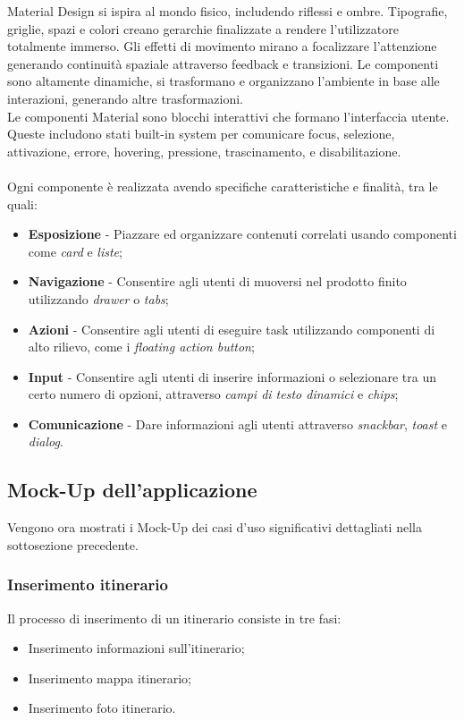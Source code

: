 \documentclass{natourDoc}
\begin{document}
Material Design si ispira al mondo fisico, includendo riflessi e ombre. Tipografie, griglie, spazi e colori creano gerarchie finalizzate a rendere l'utilizzatore totalmente immerso.
Gli effetti di movimento mirano a focalizzare l'attenzione generando continuità spaziale attraverso feedback e transizioni.
Le componenti sono altamente dinamiche, si trasformano e organizzano l'ambiente in base alle interazioni, generando altre trasformazioni.\\
Le componenti Material sono blocchi interattivi che formano l'interfaccia utente.
Queste includono stati built-in system per comunicare focus, selezione, attivazione, errore, hovering, pressione, trascinamento, e disabilitazione. \\\\
Ogni componente è realizzata avendo specifiche caratteristiche e finalità, tra le quali:
\begin{itemize}
	\item \textbf{Esposizione} - Piazzare ed organizzare contenuti correlati usando componenti come \textit{card} e \textit{liste};
	\item \textbf{Navigazione} - Consentire agli utenti di muoversi nel prodotto finito utilizzando \textit{drawer} o \textit{tabs};
	\item \textbf{Azioni} - Consentire agli utenti di eseguire task utilizzando componenti di alto rilievo, come i \textit{floating action button};
	\item \textbf{Input} - Consentire agli utenti di inserire informazioni o selezionare tra un certo numero di opzioni, attraverso \textit{campi di testo dinamici} e \textit{chips};
	\item \textbf{Comunicazione} - Dare informazioni agli utenti attraverso \textit{snackbar}, \textit{toast} e \textit{dialog}.
\end{itemize}

\newpage
\subsection{Mock-Up dell'applicazione}
Vengono ora mostrati i Mock-Up dei casi d'uso significativi dettagliati nella sottosezione precedente.
\subsubsection{Inserimento itinerario}
Il processo di inserimento di un itinerario consiste in tre fasi:
\begin{itemize}
	\item Inserimento informazioni sull'itinerario;
	\item Inserimento mappa itinerario;
	\item Inserimento foto itinerario.
\end{itemize}
\end{document}
